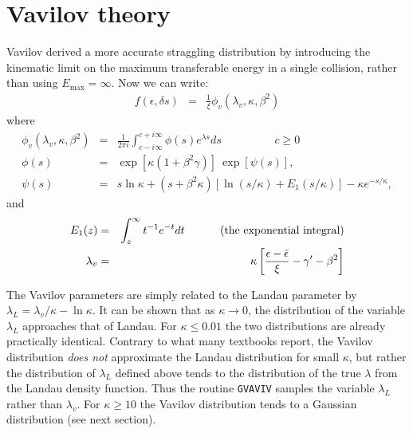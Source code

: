 \documentclass{article}
\newcommand{\Emax}{\ensuremath{E_{\mathrm{max}}}}
\begin{document}
\newpage
\section{Vavilov theory}
\label{vavref}

Vavilov\cite{bib-VAVI} derived a more accurate straggling distribution
by introducing the kinematic limit on the maximum transferable energy
in a single collision, rather than using $ \Emax = \infty $.
Now we can write\cite{bib-SCH1}:
\begin{eqnarray*}
f \left ( \epsilon, \delta s \right ) & = & \frac{1}{\xi} \phi_{v}
\left ( \lambda_{v}, \kappa, \beta^{2} \right )
\end{eqnarray*}
where
\begin{eqnarray*}
\phi_{v} \left ( \lambda_{v}, \kappa, \beta^{2} \right ) & = &
\frac{1}{2 \pi i} \int^{c+i\infty}_{c-i\infty}\phi \left( s \right ) 
e^{\lambda s} ds \hspace{2cm} c \geq 0 \\
\phi \left ( s \right ) & = & 
\exp \left [ \kappa ( 1 + \beta^{2}\gamma ) \right ]
~ \exp \left [ \psi \left ( s \right ) \right ], \\
\psi \left ( s \right )  & = & s \ln \kappa + ( s + \beta^{2} \kappa )
\left [ \ln (s/\kappa) + E_{1} (s/\kappa) \right ] - \kappa e^{-s/\kappa}, 
\end{eqnarray*}
and
\begin{eqnarray*}
E_{1}(z) & = & \int^{\infty}_{z} t^{-1} e^{-t} dt 
\mbox{\hspace{1cm} (the exponential integral)} \\
\lambda_v & = & \kappa \left [ \frac{\epsilon - \bar{\epsilon}}{\xi}
- \gamma' - \beta^2 \right]
\end{eqnarray*}

The Vavilov parameters are simply related to the Landau parameter by
$\lambda_L = \lambda_v/\kappa - \ln\kappa $. It can be shown that as
$\kappa \rightarrow 0$, the distribution of the variable $\lambda_L$
approaches that of Landau. For $\kappa \leq 0.01$ the two
distributions are already practically identical. Contrary to what many
textbooks report, the Vavilov distribution \emph{does not} approximate
the Landau distribution for small $\kappa$, but rather the
distribution of $\lambda_L$ defined above tends to the distribution of
the true $\lambda$ from the Landau density function.  Thus the routine
\texttt{GVAVIV} samples the variable $\lambda_L$ rather than
$\lambda_v$.  For $\kappa \geq 10$ the Vavilov distribution tends to a
Gaussian distribution (see next section).
 
\end{document}
